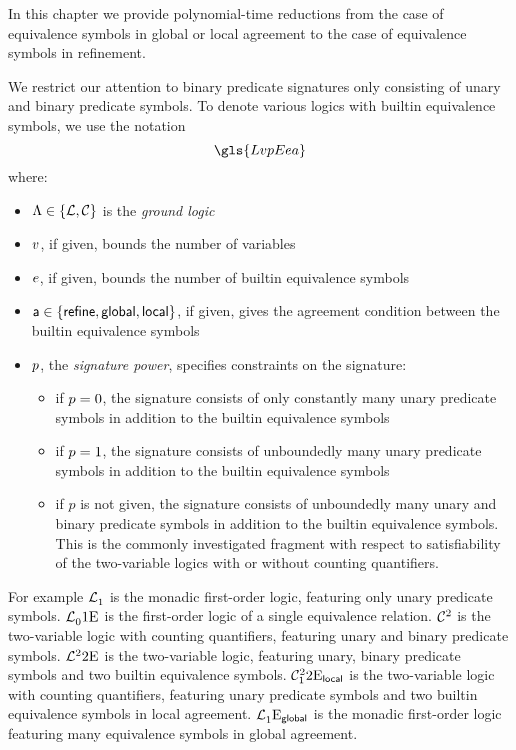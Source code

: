 In this chapter we provide polynomial-time reductions from the case of
equivalence symbols in global or local agreement to the case of equivalence
symbols in refinement.

We restrict our attention to binary predicate signatures only consisting of
unary and binary predicate symbols.
To denote various logics with builtin equivalence symbols, we use the notation
\[
  \gls{LvpEea}
\]
where:
\begin{itemize}
  \item $\Lambda \in \left\{\mathcal{L}, \mathcal{C}\right\}$ is the \emph{ground logic}
  \item $v$, if given, bounds the number of variables
  \item $e$, if given, bounds the number of builtin equivalence symbols
  \item $\mathsf{a} \in \left\{\mathsf{refine}, \mathsf{global}, \mathsf{local}\right\}$, if given, gives the
  agreement condition between the builtin equivalence symbols
  \item $p$, the \emph{signature power}, specifies constraints on the
  signature:
  \begin{itemize}
    \item if $p = 0$, the signature consists of only constantly many unary
    predicate symbols in addition to the builtin equivalence symbols
    \item if $p = 1$, the signature consists of unboundedly many unary
    predicate symbols in addition to the builtin equivalence symbols
    \item if $p$ is not given, the signature consists of unboundedly many unary
    and binary predicate symbols in addition to the builtin equivalence symbols.
    This is the commonly investigated fragment with respect to satisfiability of
    the two-variable logics with or without counting quantifiers.
  \end{itemize}
\end{itemize}

For example $\mathcal{L}^{{}}_{1}$ is the monadic first-order logic, featuring only
unary predicate symbols.
$\mathcal{L}^{{}}_{0}{1}\mathrm{E}_{{}}$ is the first-order logic of a single equivalence
relation.
$\mathcal{C}^{2}_{{}}$ is the two-variable logic with counting quantifiers, featuring
unary and binary predicate symbols.
$\mathcal{L}^{2}_{{}}{2}\mathrm{E}_{{}}$ is the two-variable logic, featuring unary, binary
predicate symbols and two builtin equivalence symbols.
$\mathcal{C}^{2}_{1}{2}\mathrm{E}_{\mathsf{local}}$ is the two-variable logic with counting quantifiers,
featuring unary predicate symbols and two builtin equivalence symbols in local
agreement.
$\mathcal{L}^{{}}_{1}{{}}\mathrm{E}_{\mathsf{global}}$ is the monadic first-order logic featuring
many equivalence symbols in global agreement.

